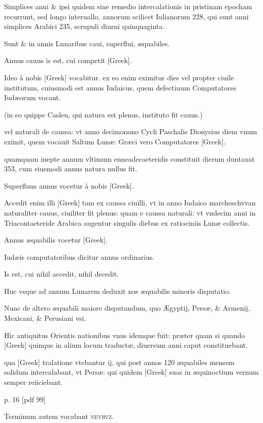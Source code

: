 Simplices anni \& ipsi quidem sine remedio
intercalationis in pristinam epocham recurrunt, sed longo interuallo,
annorum scilicet Iulianorum 228, qui sunt anni simplices Arabici 235,
scrupuli diurni quinquaginta.

Sunt \& in annis Lunaribus caui, superflui,
æquabiles.

Annus cauus is est, cui competit \textgreek{[Greek]}.

Ideo à nobis \textgreek{[Greek]} vocabitur. ex eo enim eximitur dies
vel propter ciuile institutum, cuiusmodi est annus Iudaicus,
quem defectiuum
Computatores Iudæorum vocant.

(in eo quippe Casleu, qui natura est plenus, instituto fit cauus.)

vel naturali de caussa: vt anno
decimonono Cycli Paschalis Dionysius diem vnum eximit, quem
vocauit Saltum Lunæ: Græci vero Computatores \textgreek{[Greek]}.

quamquam inepte annum vltimum enneadecaeteridis constituit dierum
duntaxat 353, cum eiusmodi annus natura nullus fit.

Superfluus
annus vocetur à nobis \textgreek{[Greek]}.

Accedit enim illi \textgreek{[Greek]}
tam ex caussa ciuilli, vt in anno Iudaico marcheschvvan naturaliter
cauus, ciuiliter fit plenus: quam e caussa naturali: vt vndecim anni
in Triacontaeteride Arabica augentur singulis diebus ex ratiociniis
Lunæ collectis.

Annus æquabilis vocetur \textgreek{[Greek]}.

Iudæis computatoribus
dicitur annus ordinarius.

Is est, cui nihil accedit, nihil decedit.

Huc vsque ad annum Lunarem deduxit nos æquabilis minoris
disputatio.

Nunc de altero æquabili maiore disputandum, quo Ægyptij,
Persæ, \& Armenij, Mexicani, \& Perusiani vsi.

Hic antiquitus
Orientis nationibus vnus idemque fuit: præter quam si quando \textgreek{[Greek]}
quinque in alium locum traductæ, diuersum anni caput constituebant.

qua \textgreek{[Greek]} tralatione vtebantur ij, qui post annos 120
æquabiles mensem solidum intercalabant, vt Persæ: qui quidem \textgreek{[Greek]}
suas in æquinoctium vernum semper reiiciebant.



p. 16 [pdf 99]


Terminum autem vocabant \textsc{nevrvz}.

